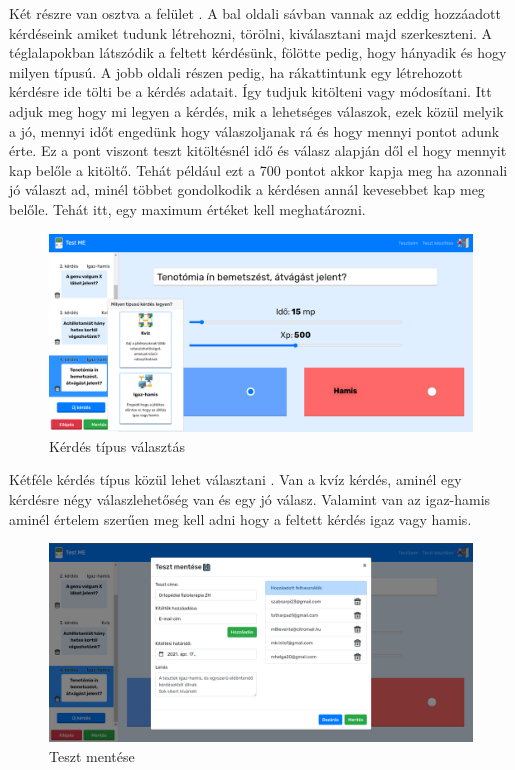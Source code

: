 Két részre van osztva a felület . A bal oldali sávban vannak az eddig hozzáadott kérdéseink amiket tudunk létrehozni, törölni, kiválasztani majd szerkeszteni. A téglalapokban látszódik a feltett kérdésünk, fölötte pedig, hogy hányadik és hogy milyen típusú. A jobb oldali részen pedig, ha rákattintunk egy létrehozott kérdésre ide tölti be a kérdés adatait. Így tudjuk kitölteni vagy módosítani. Itt adjuk meg hogy mi legyen a kérdés, mik a lehetséges válaszok, ezek közül melyik a jó, mennyi időt engedünk hogy válaszoljanak rá és hogy mennyi pontot adunk érte. Ez a pont viszont teszt kitöltésnél idő és válasz alapján dől el hogy mennyit kap belőle a kitöltő. Tehát például ezt a 700 pontot akkor kapja meg ha azonnali jó választ ad, minél többet gondolkodik a kérdésen annál kevesebbet kap meg belőle. Tehát itt, egy maximum értéket kell meghatározni.

\begin{figure}[H]
    \centering
    \includegraphics[width=\linewidth]{images/make_test2.png}
    \caption{Kérdés típus választás}
    \label{fig:make_test2}
\end{figure}

Kétféle kérdés típus közül lehet választani . Van a kvíz kérdés, aminél egy kérdésre négy válaszlehetőség van és egy jó válasz. Valamint van az igaz-hamis aminél értelem szerűen meg kell adni hogy a feltett kérdés igaz vagy hamis.


\begin{figure}[H]
    \centering
    \includegraphics[width=\linewidth]{images/make_test3.png}
    \caption{Teszt mentése}
    \label{fig:make_test3}
\end{figure}

